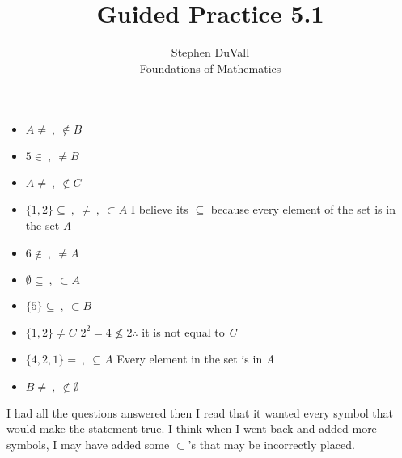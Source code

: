 \documentclass[12pt]{article}
\newenvironment{prchk}[2][Progress Check]{\begin{trivlist}
\item[\hskip \labelsep {\bfseries #1}\hskip \labelsep {\bfseries #2.}]}{\end{trivlist}}
\begin{document}
\title{Guided Practice 5.1}
\author{Stephen DuVall \\
Foundations of Mathematics}

\maketitle

\begin{prchk}{5.3}
\hfill
\begin{itemize}
\item $A \neq\ ,\ \not\in B$
\item $5 \in\ ,\ \neq B$
\item $A \neq\ ,\ \not\in C$ 
\item $\{1, 2\} \subseteq\ ,\ \neq\ ,\ \subset A$ \hspace{2em} I believe its $\subseteq$ because every element of the set is in the set \emph{A}
\item $6 \not\in\ ,\ \not= A$
\item $\emptyset \subseteq\ ,\ \subset A$
\item $\{5\} \subseteq\ ,\ \subset B$
\item $\{1, 2\} \not= C$ \hspace{2em} $2^2 = 4 \not\leq 2 \therefore$ it is not equal to \emph{C}
\item $\{4, 2, 1\} =\ ,\ \subseteq A$ \hspace{2em} Every element in the set is in \emph{A}
\item $B \not=\ ,\ \not\in \emptyset$
\end{itemize}
\end{prchk}
I had all the questions answered then I read that it wanted every symbol that would make the statement true. I think when I went back and added more symbols, I may have added some $\subset$'s that may be incorrectly placed. 
\end{document}

